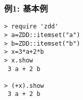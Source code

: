 \subsubsection*{例1: 基本例}



\begin{Verbatim}[baselinestretch=0.7,frame=single]
> require 'zdd'
> a=ZDD::itemset("a")
> b=ZDD::itemset("b")
> x=3*a+2*b
> x.show
 3 a + 2 b

> (+x).show
 3 a + 2 b
\end{Verbatim}
